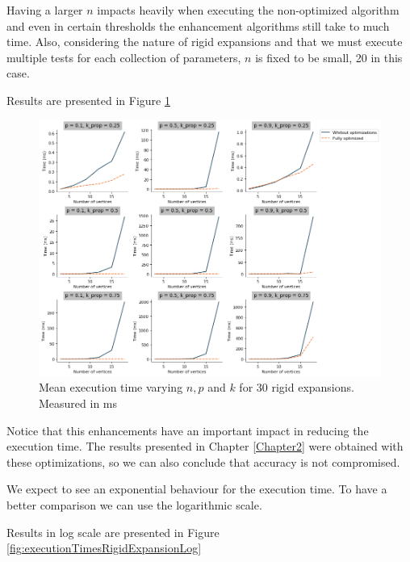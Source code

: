 Having a larger $n$ impacts heavily when executing the non-optimized algorithm and even in certain thresholds the enhancement algorithms still take to much time. Also, considering the nature of rigid expansions and that we must execute multiple tests for each collection of parameters, $n$ is fixed to be small, 20 in this case. 

Results are presented in Figure \ref{fig:executionTimesRigidExpansion}

\begin{figure}[h!]
	\centering
	\includegraphics[scale=0.45]{Python/Figures/Time-execution-rigid-expansions.png}
	\caption{Mean execution time varying $n, p$ and $k$ for 30 rigid expansions. Measured in ms }
	\label{fig:executionTimesRigidExpansion}
\end{figure}

Notice that this enhancements have an important impact in reducing the execution time. The results presented in Chapter \ref{Chapter2} were obtained with these optimizations, so we can also conclude that accuracy is not compromised.

We expect to see an exponential behaviour for the execution time. To have a better comparison we can use the logarithmic scale.

Results in log scale are presented in Figure \ref{fig:executionTimesRigidExpansionLog}

